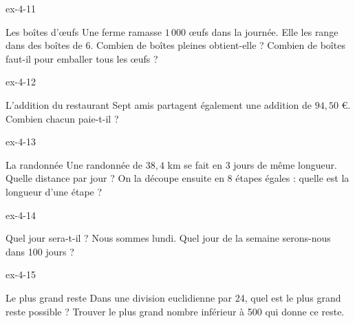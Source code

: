 \begin{blocLivre}{ex-4-11}\begin{exercice}[3]{Les boîtes d’œufs}
Une ferme ramasse $1\,000$ œufs dans la journée. Elle les range dans des boîtes de 6. Combien de boîtes pleines obtient-elle ? Combien de boîtes faut-il pour emballer tous les œufs ?
\end{exercice}\end{blocLivre}
\begin{blocLivre}{ex-4-12}\begin{exercice}[3]{L’addition du restaurant}
Sept amis partagent également une addition de $94{,}50$ €. Combien chacun paie-t-il ?
\end{exercice}\end{blocLivre}
\begin{blocLivre}{ex-4-13}\begin{exercice}[3]{La randonnée}
Une randonnée de $38{,}4$ km se fait en 3 jours de même longueur. Quelle distance par jour ? On la découpe ensuite en 8 étapes égales : quelle est la longueur d’une étape ?
\end{exercice}\end{blocLivre}
\begin{blocLivre}{ex-4-14}\begin{exercice}[3]{Quel jour sera-t-il ?}
Nous sommes lundi. Quel jour de la semaine serons-nous dans 100 jours ?
\end{exercice}\end{blocLivre}
\begin{blocLivre}{ex-4-15}\begin{exercice}[3]{Le plus grand reste}
Dans une division euclidienne par 24, quel est le plus grand reste possible ? Trouver le plus grand nombre inférieur à 500 qui donne ce reste.
\end{exercice}\end{blocLivre}

\clearpage
